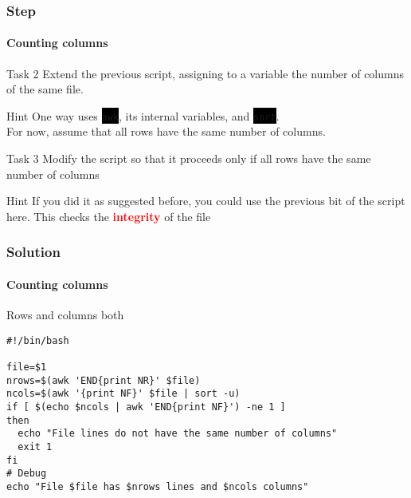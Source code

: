 \documentclass[unknownkeysallowed, 10pt, a4 paper, handout]{beamer}
\newcommand{\focus}[1]{\textbf{\textcolor{red}{#1}}}
\newcommand{\code}[1]{\colorbox{black}{\color{green}\texttt{#1}}}
\begin{document}
\begin{frame}
  \frametitle{Step}
  \framesubtitle{Counting columns}

  \begin{exampleblock}{Task 2}
    Extend the previous script, assigning to a variable the number of columns
    of the same file.
  \end{exampleblock}

  \begin{alertblock}{Hint}
    One way uses \code{awk}, its internal variables, and \code{sort}.\\
    For now, assume that all rows have the same number of columns.
  \end{alertblock}

  \begin{exampleblock}{Task 3}
    Modify the script so that it proceeds only if all rows
    have the same number of columns
  \end{exampleblock}

  \begin{alertblock}{Hint}
    If you did it as suggested before, you could use the previous bit of
    the script here. This checks the \focus{integrity} of the file
  \end{alertblock}
\end{frame}


\begin{frame}[fragile=singleslide]
  \frametitle{Solution}
  \framesubtitle{Counting columns}

  \begin{exampleblock}{Rows and columns both}
    \begin{verbatim}
#!/bin/bash

file=$1
nrows=$(awk 'END{print NR}' $file)
ncols=$(awk '{print NF}' $file | sort -u)
if [ $(echo $ncols | awk 'END{print NF}') -ne 1 ]
then
  echo "File lines do not have the same number of columns"
  exit 1
fi
# Debug
echo "File $file has $nrows lines and $ncols columns"
    \end{verbatim}
  \end{exampleblock}
\end{frame}
\end{document}
